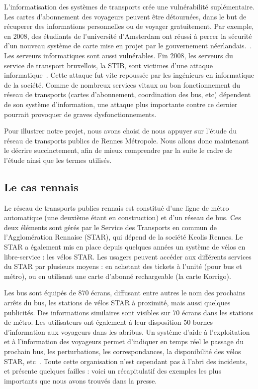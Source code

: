     	L'informatisation des systèmes de transports crée une vulnérabilité suplémentaire. Les cartes d'abonnement des voyageurs peuvent être détournées, dans le but de récuperer des informations personnelles ou de voyager gratuitement. Par exemple, en 2008, des étudiants de l'université d'Amsterdam ont réussi à percer la sécurité d'un nouveau système de carte mise en projet par le gouvernement néerlandais.~\cite{Amst_RFID}. Les serveurs informatiques sont aussi vulnérables. Fin 2008, les serveurs du service de transport bruxellois, la STIB, sont victimes d'une attaque informatique~\cite{STIB}. 
    	Cette attaque fut vite repoussée par les ingénieurs en informatique de la société. Comme de nombreux services vitaux au bon fonctionnement du réseau de transports (cartes d'abonnement, coordination des bus, etc) dépendent de son système d'information, une attaque plus importante contre ce dernier pourrait provoquer de graves dysfonctionnements.

    	Pour illustrer notre projet, nous avons choisi de nous appuyer sur l'étude du réseau de transports publics de Rennes Métropole. Nous allons donc maintenant le décrire succinctement, afin de mieux comprendre par la suite le cadre de l'étude ainsi que les termes utilisés.
                
    \subsection{Le cas rennais}
    	Le réseau de transports publics rennais est constitué d'une ligne de métro automatique (une deuxième étant en construction) et d'un réseau de bus. Ces deux éléments sont gérés par le Service des Transports en commun de l'Agglomération Rennaise (STAR), qui dépend de la société Keolis Rennes. Le STAR a également mis en place depuis quelques années un système de vélos en libre-service : les vélos STAR. Les usagers peuvent accéder aux différents services du STAR par plusieurs moyens : en achetant des tickets à l'unité (pour bus et métro), ou en utilisant une carte d'abonné rechargeable (la carte Korrigo). 

        Les bus sont équipés de 870 écrans, diffusant entre autres le nom des prochains arrêts du bus, les stations de vélos STAR à proximité, mais aussi quelques publicités. Des informations similaires sont visibles sur 70 écrans dans les stations de métro. Les utilisateurs ont également à leur disposition 50 bornes d’information aux voyageurs dans les abribus. Un système d’aide à l’exploitation et à l’information des voyageurs permet d’indiquer en temps réel le passage du prochain bus, les perturbations, les correspondances, la disponibilité des vélos STAR, etc~\cite{chiffres_star}. Toute cette organisation n'est cependant pas à l'abri des incidents, et présente quelques failles : voici un récapitulatif des exemples les plus importants que nous avons trouvés dans la presse.
        

